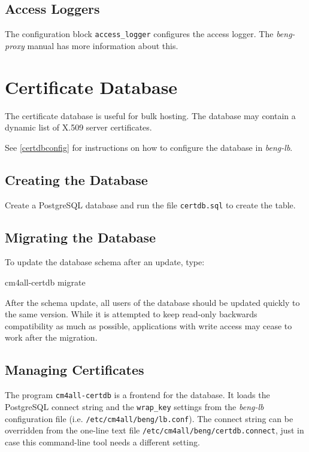 \documentclass[a4paper,12pt]{article}
\begin{document}
\subsection{Access Loggers}

The configuration block \verb|access_logger| configures the access
logger.  The \emph{beng-proxy} manual has more information about this.


\section{Certificate Database}
\label{certdb}

The certificate database is useful for bulk hosting.  The database may
contain a dynamic list of X.509 server certificates.

See \ref{certdbconfig} for instructions on how to configure the
database in \emph{beng-lb}.

\subsection{Creating the Database}

Create a PostgreSQL database and run the file \texttt{certdb.sql} to
create the table.

\subsection{Migrating the Database}

To update the database schema after an update, type:

\begin{verbatim*}
cm4all-certdb migrate
\end{verbatim*}

After the schema update, all users of the database should be updated
quickly to the same version.  While it is attempted to keep read-only
backwards compatibility as much as possible, applications with write
access may cease to work after the migration.

\subsection{Managing Certificates}

The program \texttt{cm4all-certdb} is a frontend for the database.  It
loads the PostgreSQL connect string and the \verb|wrap_key| settings
from the \emph{beng-lb} configuration file
(i.e. \texttt{/etc/cm4all/beng/lb.conf}).  The connect string can be
overridden from the one-line text file
\texttt{/etc/cm4all/beng/certdb.connect}, just in case this
command-line tool needs a different setting.
\end{document}
